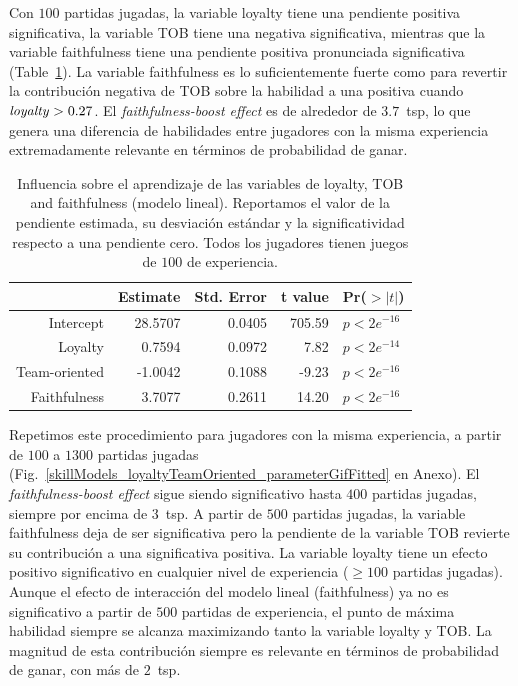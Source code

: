 \documentclass[a4paper,11pt]{book}
\theoremstyle{definition}
\begin{document}
Con $100$ partidas jugadas, la variable loyalty tiene una pendiente positiva significativa, la variable TOB tiene una negativa significativa, mientras que la variable faithfulness tiene una pendiente positiva pronunciada significativa (Table~\ref{model}).
%
La variable faithfulness es lo suficientemente fuerte como para revertir la contribución negativa de TOB sobre la habilidad a una positiva cuando $\text{\emph{loyalty}}>0.27$.
%
El \emph{faithfulness-boost effect} es de alrededor de $3.7$~tsp, lo que genera una diferencia de habilidades entre jugadores con la misma experiencia extremadamente relevante en términos de probabilidad de ganar.

\begin{table}[ht]
\centering
\begin{tabular}{rrrrl}
  \hline
 & Estimate & Std. Error & t value & Pr($>|t|$) \\
  \hline
Intercept & 28.5707 & 0.0405 & 705.59 & $p< 2e^{-16}$ \\
  Loyalty & 0.7594 & 0.0972 & 7.82 & $p< 2e^{-14}$ \\
  Team-oriented & -1.0042 & 0.1088 & -9.23 & $p< 2e^{-16}$ \\
  Faithfulness & 3.7077 & 0.2611 & 14.20 & $p< 2e^{-16}$ \\
   \hline
\end{tabular}
\caption{
Influencia sobre el aprendizaje de las variables de loyalty, TOB and faithfulness (modelo lineal). Reportamos el valor de la pendiente estimada, su desviación estándar y la significatividad respecto a una pendiente cero. Todos los jugadores tienen juegos de $100$ de experiencia.
}
\label{model}
\end{table}

Repetimos este procedimiento para jugadores con la misma experiencia, a partir de $100$ a $1300$ partidas jugadas (Fig.~\ref{skillModels_loyaltyTeamOriented_parameterGifFitted} en Anexo).
%
El \emph{faithfulness-boost effect} sigue siendo significativo hasta $400$ partidas jugadas, siempre por encima de $3$~tsp.
%
A partir de $500$ partidas jugadas, la variable faithfulness deja de ser significativa pero la pendiente de la variable TOB revierte su contribución a una significativa positiva.
%
La variable loyalty tiene un efecto positivo significativo en cualquier nivel de experiencia ($\geq 100$ partidas jugadas).
%
Aunque el efecto de interacción del modelo lineal (faithfulness) ya no es significativo a partir de $500$ partidas de experiencia, el punto de máxima habilidad siempre se alcanza maximizando tanto la variable loyalty y TOB.
%
La magnitud de esta contribución siempre es relevante en términos de probabilidad de ganar, con más de $2$~tsp.
\end{document}

